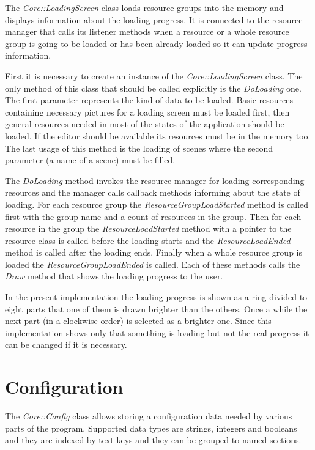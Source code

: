 \documentclass[a4paper, 12pt]{report}
\begin{document}
The \emph{Core::LoadingScreen} class loads resource groups into the memory and displays information about the loading progress. It is connected to the resource manager that calls its listener methods when a resource or a whole resource group is going to be loaded or has been already loaded so it can update progress information.

First it is necessary to create an instance of the \emph{Core::LoadingScreen} class. The only method of this class that should be called explicitly is the \emph{DoLoading} one. The first parameter represents the kind of data to be loaded. Basic resources containing necessary pictures for a loading screen must be loaded first, then general resources needed in most of the states of the application should be loaded. If the editor should be available its resources must be in the memory too. The last usage of this method is the loading of scenes where the second parameter (a name of a scene) must be filled.

The \emph{DoLoading} method invokes the resource manager for loading corresponding resources and the manager calls callback methods informing about the state of loading. For each resource group the \emph{ResourceGroupLoadStarted} method is called first with the group name and a count of resources in the group. Then for each resource in the group the \emph{ResourceLoadStarted} method with a pointer to the resource class is called before the loading starts and the \emph{ResourceLoadEnded} method is called after the loading ends. Finally when a whole resource group is loaded the \emph{ResourceGroupLoadEnded} is called. Each of these methods calls the \emph{Draw} method that shows the loading progress to the user.

In the present implementation the loading progress is shown as a ring divided to eight parts that one of them is drawn brighter than the others. Once a while the next part (in a clockwise order) is selected as a brighter one. Since this implementation shows only that something is loading but not the real progress it can be changed if it is necessary.

\section{Configuration}
\label{sec:config}

The \emph{Core::Config} class allows storing a configuration data needed by various parts of the program. Supported data types are strings, integers and booleans and they are indexed by text keys and they can be grouped to named sections.
\end{document}
